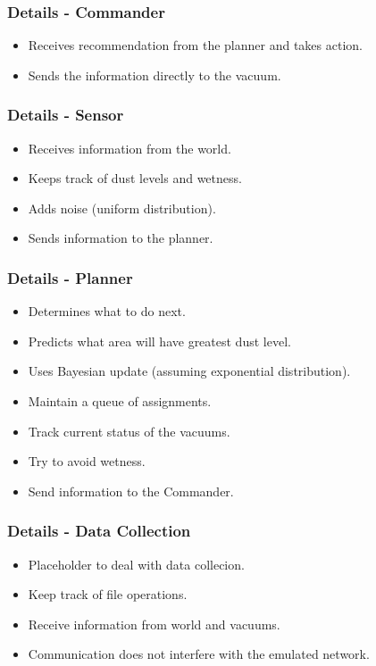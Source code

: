 \documentclass{beamer}
\begin{document}
\begin{frame}
  \frametitle{Details - Commander}

  \begin{itemize}
  \item Receives recommendation from the planner and takes action.
  \item Sends the information directly to the vacuum.
  \end{itemize}

\end{frame}


\begin{frame}
  \frametitle{Details - Sensor}
  
  \begin{itemize}
  \item Receives information from the world.
  \item Keeps track of dust levels and wetness.
  \item Adds noise (uniform distribution).
  \item Sends information to the planner.
  \end{itemize}

\end{frame}


\begin{frame}
  \frametitle{Details - Planner}

  \begin{itemize}
  \item Determines what to do next.
  \item Predicts what area will have greatest dust level.
  \item Uses Bayesian update (assuming exponential distribution).
  \item Maintain a queue of assignments.
  \item Track current status of the vacuums.
  \item Try to avoid wetness.
  \item Send information to the Commander.
  \end{itemize}
  
\end{frame}


\begin{frame}
  \frametitle{Details - Data Collection}

  \begin{itemize}
  \item Placeholder to deal with data collecion.
  \item Keep track of file operations.
  \item Receive information from  world and vacuums.
  \item Communication does not interfere with the emulated network.
  \end{itemize}

\end{frame}
\end{document}
